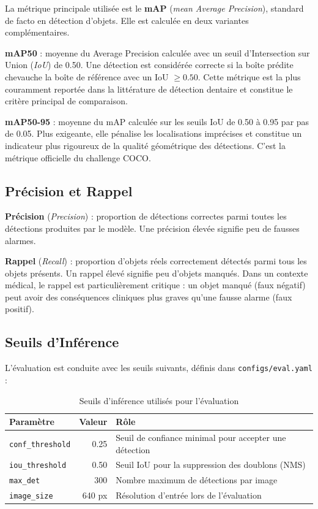 \documentclass{rapportENSIAS}
\newcommand{\projectpath}[1]{\texttt{#1}}
\begin{document}
La métrique principale utilisée est le \textbf{mAP} (\textit{mean Average
Precision}), standard de facto en détection d'objets. Elle est calculée en
deux variantes complémentaires.

\textbf{mAP50} : moyenne du Average Precision calculée avec un seuil
d'Intersection sur Union (\textit{IoU}) de 0.50. Une détection est considérée
correcte si la boîte prédite chevauche la boîte de référence avec un IoU
$\geq 0.50$. Cette métrique est la plus couramment reportée dans la littérature
de détection dentaire et constitue le critère principal de comparaison.

\textbf{mAP50-95} : moyenne du mAP calculée sur les seuils IoU de 0.50 à 0.95
par pas de 0.05. Plus exigeante, elle pénalise les localisations imprécises
et constitue un indicateur plus rigoureux de la qualité géométrique des
détections. C'est la métrique officielle du challenge COCO.

\subsection{Précision et Rappel}

\textbf{Précision} (\textit{Precision}) : proportion de détections correctes
parmi toutes les détections produites par le modèle. Une précision élevée
signifie peu de fausses alarmes.

\textbf{Rappel} (\textit{Recall}) : proportion d'objets réels correctement
détectés parmi tous les objets présents. Un rappel élevé signifie peu
d'objets manqués. Dans un contexte médical, le rappel est particulièrement
critique : un objet manqué (faux négatif) peut avoir des conséquences
cliniques plus graves qu'une fausse alarme (faux positif).

\subsection{Seuils d'Inférence}

L'évaluation est conduite avec les seuils suivants, définis dans
\projectpath{configs/eval.yaml} :

\begin{table}[H]
\centering
\caption{Seuils d'inférence utilisés pour l'évaluation}
\label{tab:seuils_inference}
\begin{tabular}{lrl}
\toprule
\textbf{Paramètre} & \textbf{Valeur} & \textbf{Rôle} \\
\midrule
\texttt{conf\_threshold} & 0.25
  & Seuil de confiance minimal pour accepter une détection \\
\texttt{iou\_threshold}  & 0.50
  & Seuil IoU pour la suppression des doublons (NMS) \\
\texttt{max\_det}        & 300
  & Nombre maximum de détections par image \\
\texttt{image\_size}     & 640 px
  & Résolution d'entrée lors de l'évaluation \\
\bottomrule
\end{tabular}
\end{table}
\end{document}
